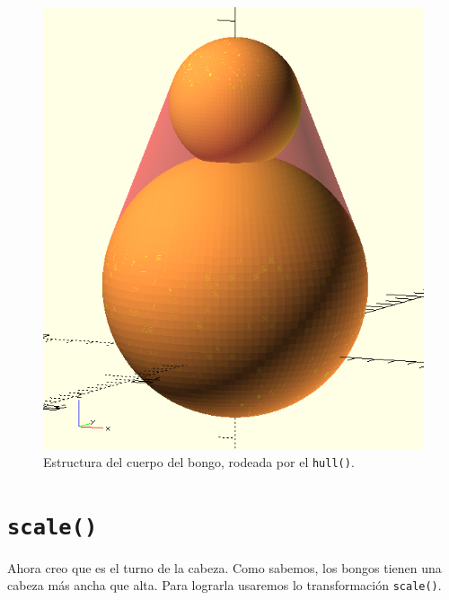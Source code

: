 \begin{figure}[ht]
  \centering
  \includegraphics[width=.5\textwidth]{imagenes/cuerpo-transparente}
  \caption{Estructura del cuerpo del bongo, rodeada por el
    \lstinline!hull()!.}
  \label{fig:cuerpo-transparente}
\end{figure}
  


\section{\texttt{scale()}}


\guillemotright Ahora creo que es el turno de la cabeza. Como sabemos, los
  bongos tienen una cabeza más ancha que alta. Para lograrla usaremos
  lo transformación \lstinline!scale()!.

